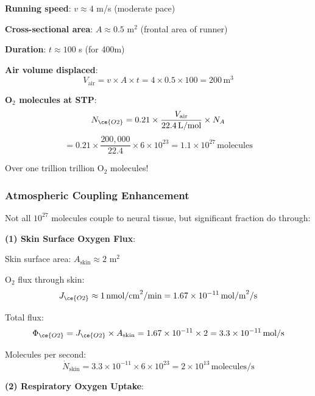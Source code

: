 \documentclass[11pt,onecolumn]{article}
\begin{document}
\textbf{Running speed}: $v \approx 4$ m/s (moderate pace)

\textbf{Cross-sectional area}: $A \approx 0.5$ m$^2$ (frontal area of runner)

\textbf{Duration}: $t \approx 100$ s (for 400m)

\textbf{Air volume displaced}:
\begin{equation}
V_{\text{air}} = v \times A \times t = 4 \times 0.5 \times 100 = 200\,\text{m}^3
\end{equation}

\textbf{O$_2$ molecules at STP}:
\begin{equation}
N_{\ce{O2}} = 0.21 \times \frac{V_{\text{air}}}{22.4\,\text{L/mol}} \times N_A
\end{equation}
\begin{equation}
= 0.21 \times \frac{200{,}000}{22.4} \times 6 \times 10^{23} = 1.1 \times 10^{27}\,\text{molecules}
\end{equation}

Over one trillion trillion O$_2$ molecules!

\subsubsection{Atmospheric Coupling Enhancement}

Not all $10^{27}$ molecules couple to neural tissue, but significant fraction do through:

\textbf{(1) Skin Surface Oxygen Flux}:

Skin surface area: $A_{\text{skin}} \approx 2$ m$^2$

O$_2$ flux through skin:
\begin{equation}
J_{\ce{O2}} \approx 1\,\text{nmol/cm}^2\text{/min} = 1.67 \times 10^{-11}\,\text{mol/m}^2\text{/s}
\end{equation}

Total flux:
\begin{equation}
\Phi_{\ce{O2}} = J_{\ce{O2}} \times A_{\text{skin}} = 1.67 \times 10^{-11} \times 2 = 3.3 \times 10^{-11}\,\text{mol/s}
\end{equation}

Molecules per second:
\begin{equation}
\dot{N}_{\text{skin}} = 3.3 \times 10^{-11} \times 6 \times 10^{23} = 2 \times 10^{13}\,\text{molecules/s}
\end{equation}

\textbf{(2) Respiratory Oxygen Uptake}:
\end{document}
